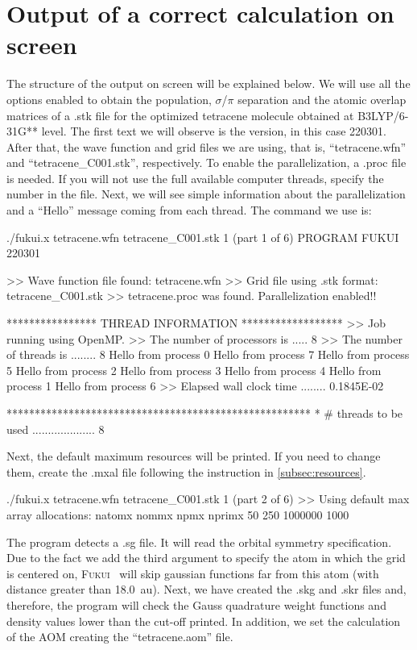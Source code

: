 \documentclass[a4paper,11pt,openany]{memoir}
\newcommand\programa{\textsc{Fukui}}
\begin{document}
\section{Output of a correct calculation on screen}\label{sec:onscreen}
The structure of the output on screen will be explained below. We will use all the options enabled to obtain the population, $\sigma$/$\pi$ separation and the atomic overlap matrices of a .stk file for the optimized tetracene molecule obtained at B3LYP/6-31G** level. The first text we will observe is the version, in this case 220301. After that, the wave function and grid files we are using, that is, ``tetracene.wfn'' and ``tetracene\_C001.stk'', respectively. To enable the parallelization, a .proc file is needed. If you will not use the full available computer threads, specify the number in the file. Next, we will see simple information about the parallelization and a ``Hello'' message coming from each thread. The command we use is:
\begin{consola}{./fukui.x tetracene.wfn tetracene\_C001.stk 1 (part 1 of 6)}
PROGRAM FUKUI 220301


>> Wave function file found: tetracene.wfn
>> Grid file using .stk format: tetracene_C001.stk
>> tetracene.proc was found. Parallelization enabled!!

**************** THREAD INFORMATION ******************
>> Job running using OpenMP.
>> The number of processors is .....   8
>> The number of threads is ........   8
Hello from process       0
Hello from process       7
Hello from process       5
Hello from process       2
Hello from process       3
Hello from process       4
Hello from process       1
Hello from process       6
>> Elapsed wall clock time ........ 0.1845E-02

******************************************************
* # threads to be used .................... 8
\end{consola}
Next, the default maximum resources will be printed. If you need to change them, create the .mxal file following the instruction in \autoref{subsec:resources}.
\begin{consola}{./fukui.x tetracene.wfn tetracene\_C001.stk 1 (part 2 of 6)}
>> Using default max array allocations:
natomx     nommx      npmx    nprimx
50       250   1000000      1000
\end{consola}
The program detects a .sg file. It will read the orbital symmetry specification. Due to the fact we add the third argument to specify the atom in which the grid is centered on, \programa~ will skip gaussian functions far from this atom (with distance greater than \SI{18.0}{au}). Next, we have created the .skg and .skr files and, therefore, the program will check the Gauss quadrature weight functions and density values lower than the cut-off printed. In addition, we set the calculation of the \ac{AOM} creating the ``tetracene.aom'' file.
\end{document}
